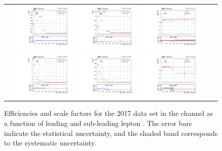 {\begin{figure}[h]
  \begin{center}
    \begin{tabular}{ccc}
      \includegraphics[width=0.32\textwidth]{fig_2017_TrigSF/g_lepApt_mumu_MC.pdf}
      \includegraphics[width=0.32\textwidth]{fig_2017_TrigSF/g_lepApt_mumu_data.pdf}
      \includegraphics[width=0.32\textwidth]{fig_2017_TrigSF/g_mumu_lepApt_FullSystUncBand.pdf}\\
      \includegraphics[width=0.32\textwidth]{fig_2017_TrigSF/g_lepBpt_mumu_MC.pdf}
      \includegraphics[width=0.32\textwidth]{fig_2017_TrigSF/g_lepBpt_mumu_data.pdf}
      \includegraphics[width=0.32\textwidth]{fig_2017_TrigSF/g_mumu_lepBpt_FullSystUncBand.pdf}\\
    \end{tabular}
    \caption{Efficiencies and scale factors for the 2017 data set in the \mumu channel as a function of leading and sub-leading lepton \pT.
            The error bars indicate the statistical uncertainty, and the shaded band corresponds to the systematic uncertainty.
            }
    \label{TrigSF_2017_3}
  \end{center}
\end{figure}

}
